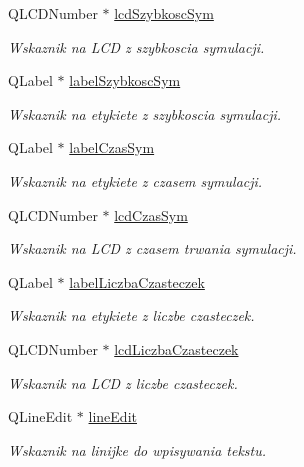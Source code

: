 \begin{DoxyCompactItemize}
Q\-L\-C\-D\-Number $\ast$ \hyperlink{class_okno_glowne_ab100c00d4ba33d896fd0985ac366296a}{lcd\-Szybkosc\-Sym}
\begin{DoxyCompactList}\small\item\em Wskaznik na L\-C\-D z szybkoscia symulacji. \end{DoxyCompactList}\item 
Q\-Label $\ast$ \hyperlink{class_okno_glowne_ad7b0708ffdf61f3bef1349cc353a6c4e}{label\-Szybkosc\-Sym}
\begin{DoxyCompactList}\small\item\em Wskaznik na etykiete z szybkoscia symulacji. \end{DoxyCompactList}\item 
Q\-Label $\ast$ \hyperlink{class_okno_glowne_aca07e1dc5cbe30d6952f9b952073bb79}{label\-Czas\-Sym}
\begin{DoxyCompactList}\small\item\em Wskaznik na etykiete z czasem symulacji. \end{DoxyCompactList}\item 
Q\-L\-C\-D\-Number $\ast$ \hyperlink{class_okno_glowne_ab34fefe738e38b1b0d4ce764481cc0c6}{lcd\-Czas\-Sym}
\begin{DoxyCompactList}\small\item\em Wskaznik na L\-C\-D z czasem trwania symulacji. \end{DoxyCompactList}\item 
Q\-Label $\ast$ \hyperlink{class_okno_glowne_ab01460f1222d0ec2892abf21efb23078}{label\-Liczba\-Czasteczek}
\begin{DoxyCompactList}\small\item\em Wskaznik na etykiete z liczbe czasteczek. \end{DoxyCompactList}\item 
Q\-L\-C\-D\-Number $\ast$ \hyperlink{class_okno_glowne_adbdd9fc009725804e015d267dc8375dc}{lcd\-Liczba\-Czasteczek}
\begin{DoxyCompactList}\small\item\em Wskaznik na L\-C\-D z liczbe czasteczek. \end{DoxyCompactList}\item 
Q\-Line\-Edit $\ast$ \hyperlink{class_okno_glowne_a0112b8be70a26552b03f38fab43a3301}{line\-Edit}
\begin{DoxyCompactList}\small\item\em Wskaznik na linijke do wpisywania tekstu. \end{DoxyCompactList}\item 

\end{DoxyCompactItemize}

